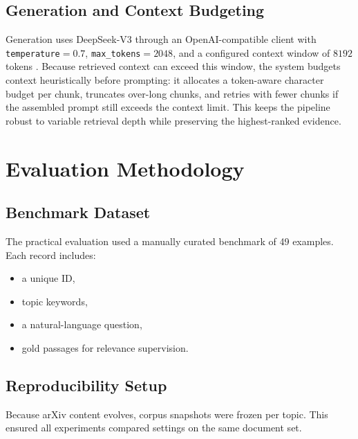 \documentclass[12pt,a4paper,titlepage,oneside]{book}
\begin{document}
\section{Generation and Context Budgeting}
Generation uses DeepSeek-V3 through an OpenAI-compatible client with \texttt{temperature}${=}0.7$, \texttt{max\_tokens}${=}2048$, and a configured context window of $8192$ tokens \cite{deepseek2024v3}. Because retrieved context can exceed this window, the system budgets context heuristically before prompting: it allocates a token-aware character budget per chunk, truncates over-long chunks, and retries with fewer chunks if the assembled prompt still exceeds the context limit. This keeps the pipeline robust to variable retrieval depth while preserving the highest-ranked evidence.

\chapter{Evaluation Methodology}

\section{Benchmark Dataset}
The practical evaluation used a manually curated benchmark of 49 examples. Each record includes:
\begin{itemize}
    \item a unique ID,
    \item topic keywords,
    \item a natural-language question,
    \item gold passages for relevance supervision.
\end{itemize}

\section{Reproducibility Setup}
Because arXiv content evolves, corpus snapshots were frozen per topic. This ensured all experiments compared settings on the same document set.
\end{document}
